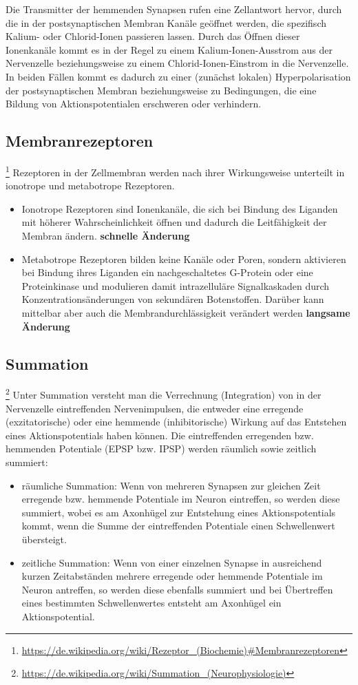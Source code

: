 Die Transmitter der hemmenden Synapsen rufen eine Zellantwort hervor, durch die in der postsynaptischen Membran Kanäle geöffnet werden, die spezifisch Kalium- oder Chlorid-Ionen passieren lassen. Durch das Öffnen dieser Ionenkanäle kommt es in der Regel zu einem Kalium-Ionen-Ausstrom aus der Nervenzelle beziehungsweise zu einem Chlorid-Ionen-Einstrom in die Nervenzelle. In beiden Fällen kommt es dadurch zu einer (zunächst lokalen) Hyperpolarisation der postsynaptischen Membran beziehungsweise zu Bedingungen, die eine Bildung von Aktionspotentialen erschweren oder verhindern.

\subsection{Membranrezeptoren}\footnote{\url{https://de.wikipedia.org/wiki/Rezeptor_(Biochemie)\#Membranrezeptoren}} 
Rezeptoren in der Zellmembran werden nach ihrer Wirkungsweise unterteilt in ionotrope und metabotrope Rezeptoren.
\begin{itemize}
	\item Ionotrope Rezeptoren sind Ionenkanäle, die sich bei Bindung des Liganden mit höherer Wahrscheinlichkeit öffnen und dadurch die Leitfähigkeit der Membran ändern. \textbf{schnelle Änderung}
	\item Metabotrope Rezeptoren bilden keine Kanäle oder Poren, sondern aktivieren bei Bindung ihres Liganden ein nachgeschaltetes G-Protein oder eine Proteinkinase und modulieren damit intrazelluläre Signalkaskaden durch Konzentrationsänderungen von sekundären Botenstoffen. Darüber kann mittelbar aber auch die Membrandurchlässigkeit verändert werden \textbf{langsame Änderung}
\end{itemize}

\subsection{Summation}\footnote{\url{https://de.wikipedia.org/wiki/Summation_(Neurophysiologie)}} 
Unter Summation versteht man die Verrechnung (Integration) von in der Nervenzelle eintreffenden Nervenimpulsen, die entweder eine erregende (exzitatorische) oder eine hemmende (inhibitorische) Wirkung auf das Entstehen eines Aktionspotentials haben können. Die eintreffenden erregenden bzw. hemmenden Potentiale (EPSP bzw. IPSP) werden räumlich sowie zeitlich summiert:
\begin{itemize}
    \item räumliche Summation: Wenn von mehreren Synapsen zur gleichen Zeit erregende bzw. hemmende Potentiale im Neuron eintreffen, so werden diese summiert, wobei es am Axonhügel zur Entstehung eines Aktionspotentials kommt, wenn die Summe der eintreffenden Potentiale einen Schwellenwert übersteigt.
    \item zeitliche Summation: Wenn von einer einzelnen Synapse in ausreichend kurzen Zeitabständen mehrere erregende oder hemmende Potentiale im Neuron antreffen, so werden diese ebenfalls summiert und bei Übertreffen eines bestimmten Schwellenwertes entsteht am Axonhügel ein Aktionspotential.
\end{itemize}

